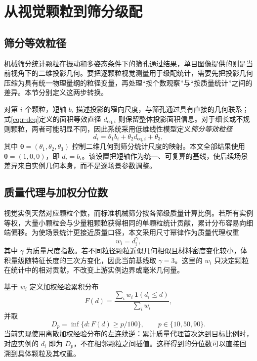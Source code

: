 \section{从视觉颗粒到筛分级配}
\label{sec:r-sieve}

\subsection{筛分等效粒径}

机械筛分统计颗粒在振动和多姿态条件下的筛孔通过结果，单目图像提供的则是当前视角下的二维投影几何。要把逐颗粒视觉测量用于级配统计，需要先把投影几何压缩为具有统一物理量纲的粒径变量，再处理“按个数观察”与“按质量统计”之间的差异。本节分别定义这两步转换。

对第 $i$ 个颗粒，短轴 $b_i$ 描述投影的窄向尺度，与筛孔通过具有直接的几何联系；式\eqref{eq:r-deq}定义的面积等效直径 $d_{\mathrm{eq},i}$ 则保留整体投影面积信息。对于细长或不规则颗粒，两者可能明显不同，因此系统采用低维线性模型定义\emph{筛分等效粒径}
\begin{equation}
 d_i=\theta_1 b_i+\theta_2 d_{\mathrm{eq},i}+\theta_3,
\label{eq:r-sieve-d}
\end{equation}
其中 $\boldsymbol{\theta}=(\theta_1,\theta_2,\theta_3)$ 控制二维几何到筛分统计尺度的映射。本文全部结果使用 $\boldsymbol{\theta}=(1,0,0)$，即 $d_i=b_i$。该设置把短轴作为统一、可复算的基线，使后续场景差异来自实例几何本身，而不是逐场景参数调整。

\subsection{质量代理与加权分位数}

视觉实例天然对应颗粒个数，而标准机械筛分按各筛级质量计算比例。若所有实例等权，大量小颗粒会与少量粗颗粒获得相同的单颗粒统计贡献，累计分布容易向细端偏移。为使场景统计更接近质量口径，本文采用尺寸幂律作为质量代理权重
\begin{equation}
 w_i=d_i^{\gamma},
\label{eq:r-mass}
\end{equation}
其中 $\gamma$ 为质量尺度指数。若不同粒径颗粒近似几何相似且材料密度变化较小，体积量级随特征长度的三次方变化，因此当前基线取 $\gamma=3$。这里的 $w_i$ 只决定颗粒在统计中的相对贡献，不改变上游实例边界或毫米几何量。

基于 $w_i$ 定义加权经验累积分布
\begin{equation}
 F(d)=\frac{\sum_i w_i\,\mathbf{1}(d_i\le d)}{\sum_i w_i},
\label{eq:r-cdf}
\end{equation}
并取
\begin{equation}
 D_p=\inf\{d:F(d)\ge p/100\},\qquad p\in\{10,50,90\}.
\label{eq:r-dp}
\end{equation}
当前实现使用离散加权经验分布的左连续逆：累计质量代理首次达到目标比例时，对应实例的 $d_i$ 即为 $D_p$，不在相邻颗粒之间插值。这样得到的分位数可以直接回溯到具体颗粒及其权重。

